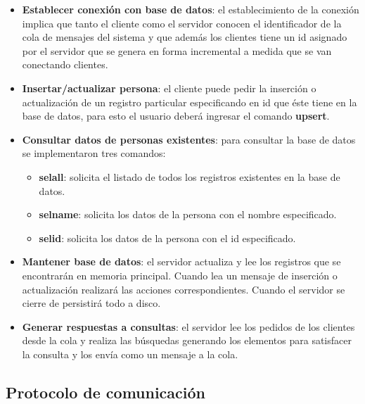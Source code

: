 \documentclass[a4paper,10pt]{article}
\begin{document}
\begin{itemize}
\item \textbf{Establecer conexión con base de datos}: el establecimiento de la conexión implica que tanto el cliente como el servidor conocen el identificador de la cola de mensajes del sistema y que además los clientes tiene un id asignado por el servidor que se genera en forma incremental a medida que se van conectando clientes.

\item \textbf{Insertar/actualizar persona}: el cliente puede pedir la inserción o actualización de un registro particular especificando en id que éste tiene en la base de datos, para esto el usuario deberá ingresar el comando \textbf{upsert}.

\item \textbf{Consultar datos de personas existentes}: para consultar la base de datos se implementaron tres comandos:

\begin{itemize}
\item \textbf{selall}: solicita el listado de todos los registros existentes en la base de datos.

\item \textbf{selname}: solicita los datos de la persona con el nombre especificado.

\item \textbf{selid}: solicita los datos de la persona con el id especificado.

\end{itemize}

\item \textbf{Mantener base de datos}: el servidor actualiza y lee los registros que se encontrarán en memoria principal. Cuando lea un mensaje de inserción o actualización realizará las acciones correspondientes. Cuando el servidor se cierre de persistirá todo a disco.

\item \textbf{Generar respuestas a consultas}: el servidor lee los pedidos de los clientes desde la cola y realiza las búsquedas generando los elementos para satisfacer la consulta y los envía como un mensaje a la cola.

\end{itemize}
\clearpage

\subsection{Protocolo de comunicación}
\end{document}
